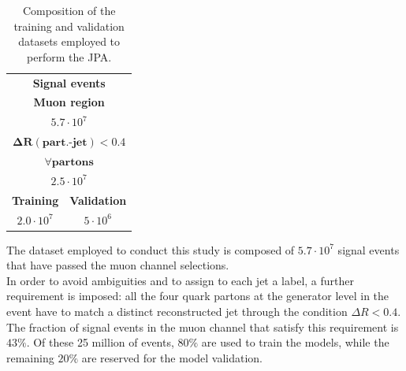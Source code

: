\begin{minipage}{\linewidth}
    \begin{minipage}{0.35\linewidth}
        \begin{table}[H]
            \centering
            \begin{tabular}{c|c}
            \toprule
                \multicolumn{2}{c}{\textbf{Signal events}}\\
                \multicolumn{2}{c}{\textbf{Muon region}}\\
                \multicolumn{2}{c}{$5.7 \cdot 10^7$}\\
                \midrule
                \multicolumn{2}{c}{$\bm{\Delta R(\textbf{part.-jet})<0.4}$}\\
                \multicolumn{2}{c}{$\forall \textbf{partons}$}\\
                \multicolumn{2}{c}{$2.5 \cdot 10^7$}\\
                \midrule
                 \textbf{Training} & \textbf{Validation}\\
                 $2.0 \cdot 10^7$& $5\cdot 10^6$\\
                 \bottomrule
            \end{tabular}
            \caption{Composition of the training and validation datasets employed to perform the JPA.}
            \label{tab:dataset}
        \end{table}
    \end{minipage}
    \hfill
    \begin{minipage}{0.6\linewidth}
    The dataset employed to conduct this study is composed of $5.7 \cdot 10^7$ signal events that have passed the muon channel selections.\\
    In order to avoid ambiguities and to assign to each jet a label, a further requirement is imposed: all the four quark partons at the generator level in the event have to match a distinct reconstructed jet through the condition $\Delta R<0.4$.\\
    The fraction of signal events in the muon channel that satisfy this requirement is $43\%$. Of these 25 million of events, $80\%$ are used to train the models, while the remaining $20\%$ are reserved for the model validation.       
    \end{minipage}
\end{minipage}

